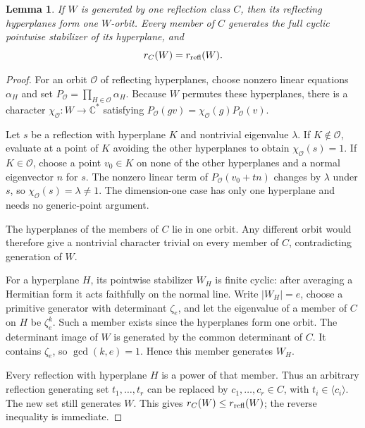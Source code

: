 \documentclass[11pt]{article}
\newtheorem{lemma}{Lemma}
\newcommand{\C}{\mathbb C}
\newcommand{\rr}{r_{\rm refl}}
\begin{document}
\begin{lemma}\label{lem:class}
If $W$ is generated by one reflection class $C$, then its reflecting
hyperplanes form one $W$-orbit. Every member of $C$ generates the full
cyclic pointwise stabilizer of its hyperplane, and
\[
                         r_C(W)=\rr(W).
\]
\end{lemma}
\begin{proof}
For an orbit $\mathcal O$ of reflecting hyperplanes, choose nonzero
linear equations $\alpha_H$ and set
$P_{\mathcal O}=\prod_{H\in\mathcal O}\alpha_H$.
Because $W$ permutes these hyperplanes, there is a character
$\chi_{\mathcal O}:W\to\C^*$ satisfying
$P_{\mathcal O}(gv)=\chi_{\mathcal O}(g)P_{\mathcal O}(v)$.

Let $s$ be a reflection with hyperplane $K$ and nontrivial eigenvalue
$\lambda$. If $K\notin\mathcal O$, evaluate at a point of $K$ avoiding
the other hyperplanes to obtain $\chi_{\mathcal O}(s)=1$.
If $K\in\mathcal O$, choose a point $v_0\in K$ on none of the other
hyperplanes and a normal eigenvector $n$ for $s$.
The nonzero linear term of $P_{\mathcal O}(v_0+tn)$ changes by
$\lambda$ under $s$, so $\chi_{\mathcal O}(s)=\lambda\ne1$.
The dimension-one case has only one hyperplane and needs no generic-point
argument.

The hyperplanes of the members of $C$ lie in one orbit.
Any different orbit would therefore give a nontrivial character trivial
on every member of $C$, contradicting generation of $W$.

For a hyperplane $H$, its pointwise stabilizer $W_H$ is finite cyclic:
after averaging a Hermitian form it acts faithfully on the normal line.
Write $|W_H|=e$, choose a primitive generator with determinant
$\zeta_e$, and let the eigenvalue of a member of $C$ on $H$ be
$\zeta_e^k$. Such a member exists since the hyperplanes form one orbit.
The determinant image of $W$ is generated by the common determinant
of $C$. It contains $\zeta_e$, so $\gcd(k,e)=1$.
Hence this member generates $W_H$.

Every reflection with hyperplane $H$ is a power of that member.
Thus an arbitrary reflection generating set $t_1,\ldots,t_r$ can be
replaced by $c_1,\ldots,c_r\in C$, with $t_i\in\langle c_i\rangle$.
The new set still generates $W$. This gives $r_C(W)\le\rr(W)$;
the reverse inequality is immediate.
\end{proof}
\end{document}
